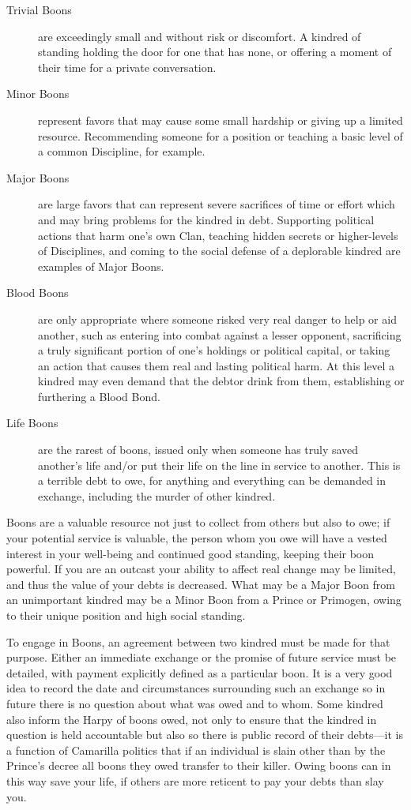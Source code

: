 \begin{description}
	\item[Trivial Boons] are exceedingly small and without risk or discomfort.  A kindred 
	of standing holding the door for one that has none, or offering a moment of their time for 
	a private conversation.
	\item[Minor Boons] represent favors that may cause some small hardship or giving up a limited 
	resource.  Recommending someone for a position or teaching a basic level of a common Discipline, 
	for example.
	\item[Major Boons] are large favors that can represent severe sacrifices of time or 
	effort which and may bring problems for the kindred in debt.  Supporting political actions 
	that harm one's own Clan, teaching hidden secrets or higher-levels of Disciplines, and 
	coming to the social defense of a deplorable kindred are examples of Major Boons.
	\item[Blood Boons] are only appropriate where someone risked very real danger to help or 
	aid another, such as entering into combat against a lesser opponent, sacrificing a truly 
	significant portion of one's holdings or political capital, or taking an action that causes 
	them real and lasting political harm.  At this level a kindred may even demand that the debtor 
	drink from them, establishing or furthering a Blood Bond.
	\item[Life Boons] are the rarest of boons, issued only when someone has truly saved another's 
	life and/or put their life on the line in service to another.  This is a terrible debt to owe, 
	for anything and everything can be demanded in exchange, including the murder of other kindred.
\end{description}

\noindent Boons are a valuable resource not just to collect from others but also to owe; if your potential 
service is valuable, the person whom you owe will have a vested interest in your well-being and 
continued good standing, keeping their boon powerful.  If you are an outcast your ability to affect 
real change may be limited, and thus the value of your debts is decreased.  What may be a Major Boon 
from an unimportant kindred may be a Minor Boon from a Prince or Primogen, owing to their unique 
position and high social standing.

To engage in Boons, an agreement between two kindred must be made for that purpose.  Either an 
immediate exchange or the promise of future service must be detailed, with payment explicitly 
defined as a particular boon.  It is a very good idea to record the date and circumstances 
surrounding such an exchange so in future there is no question about what was owed and to whom.  
Some kindred also inform the Harpy of boons owed, not only to ensure that the kindred in question 
is held accountable but also so there is public record of their debts---it is a function of 
Camarilla politics that if an individual is slain other than by the Prince's decree all boons 
they owed transfer to their killer.  Owing boons can in this way save your life, if others are 
more reticent to pay your debts than slay you.

